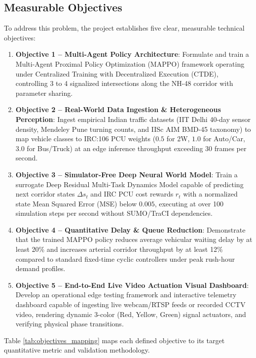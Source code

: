 \subsection{Measurable Objectives}
To address this problem, the project establishes five clear, measurable technical objectives:
\begin{enumerate}
    \item \textbf{Objective 1 -- Multi-Agent Policy Architecture}: Formulate and train a Multi-Agent Proximal Policy Optimization (MAPPO) framework operating under Centralized Training with Decentralized Execution (CTDE), controlling 3 to 4 signalized intersections along the NH-48 corridor with parameter sharing.
    \item \textbf{Objective 2 -- Real-World Data Ingestion \& Heterogeneous Perception}: Ingest empirical Indian traffic datasets (IIT Delhi 40-day sensor density, Mendeley Pune turning counts, and IISc AIM BMD-45 taxonomy) to map vehicle classes to IRC:106 PCU weights ($0.5$ for 2W, $1.0$ for Auto/Car, $3.0$ for Bus/Truck) at an edge inference throughput exceeding 30 frames per second.
    \item \textbf{Objective 3 -- Simulator-Free Deep Neural World Model}: Train a surrogate Deep Residual Multi-Task Dynamics Model capable of predicting next corridor states $\Delta s_t$ and IRC PCU cost rewards $r_t$ with a normalized state Mean Squared Error (MSE) below $0.005$, executing at over 100 simulation steps per second without SUMO/TraCI dependencies.
    \item \textbf{Objective 4 -- Quantitative Delay \& Queue Reduction}: Demonstrate that the trained MAPPO policy reduces average vehicular waiting delay by at least 20\% and increases arterial corridor throughput by at least 12\% compared to standard fixed-time cyclic controllers under peak rush-hour demand profiles.
    \item \textbf{Objective 5 -- End-to-End Live Video Actuation Visual Dashboard}: Develop an operational edge testing framework and interactive telemetry dashboard capable of ingesting live webcam/RTSP feeds or recorded CCTV video, rendering dynamic 3-color (Red, Yellow, Green) signal actuators, and verifying physical phase transitions.
\end{enumerate}

Table \ref{tab:objectives_mapping} maps each defined objective to its target quantitative metric and validation methodology.

